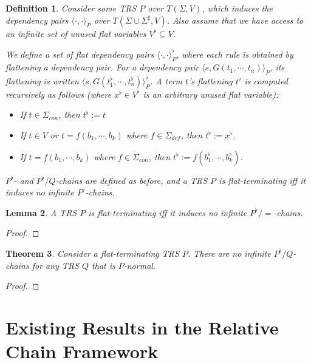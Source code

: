 \documentclass{article}
\newtheorem{theorem}{Theorem}[section]
\newtheorem{lemma}[theorem]{Lemma}
\newtheorem{definition}[theorem]{Definition}
\newcommand{\dpair}[2]{\langle #1, #2 \rangle}
\begin{document}
\begin{definition}
    Consider some TRS $P$ over $T(\Sigma, V)$, which induces the dependency pairs $\dpair{\cdot}{\cdot}_P$ over $T(\Sigma \cup \Sigma^\sharp, V)$. Also assume that we have access to an infinite set of unused \emph{flat variables} $V^\flat \subseteq V$.
    
    We define a set of \emph{flat dependency pairs} $\dpair{\cdot}{\cdot}^\flat_P$, where each rule is obtained by \emph{flattening} a dependency pair. For a dependency pair $\dpair{s}{G(t_1 , \cdots, t_n)}_P$, its flattening is written $\dpair{s}{G( t^\flat_1, \cdots, t_n^\flat)}^\flat_P$. A term $t$'s flattening $t^\flat$ is computed recursively as follows (where $x^\flat \in V^\flat$ is an arbitrary unused flat variable):
    \begin{itemize}
        \item If $t \in \Sigma_{con}$, then $t^\flat := t$
        \item If $t \in V$ or $t = f (b_1, \cdots, b_k)$ where $f \in \Sigma_{def}$, then $t^\flat := x^\flat$.
        \item If $t = f( b_1, \cdots, b_k)$ where $f \in \Sigma_{con}$, then $t^\flat := f( b^\flat_1, \cdots, b^\flat_k)$.
    \end{itemize} 
    $P^\flat$- and $P^\flat/Q$-chains are defined as before, and a TRS $P$ is \emph{flat-terminating} iff it induces no infinite $P^\flat$-chains. 
\end{definition}

\begin{lemma}
    A TRS $P$ is flat-terminating iff it induces no infinite $P^\flat/\!\!=$-chains.  
\end{lemma}

\begin{proof}
    
\end{proof}

\begin{theorem}
    Consider a flat-terminating TRS $P$. There are no infinite $P^\flat/Q$-chains for any TRS $Q$ that is $P$-normal.
\end{theorem}

\begin{proof}
    
\end{proof}



\section{Existing Results in the Relative Chain Framework}
\end{document}

